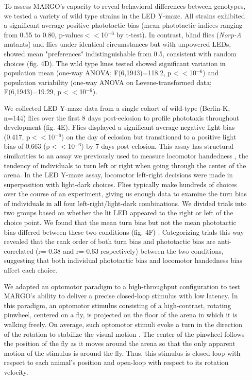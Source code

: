 \documentclass[10pt,letterpaper]{article}
\begin{document}
To assess MARGO's capacity to reveal behavioral differences between genotypes, we tested a variety of wild type strains in the LED Y-maze. All strains exhibited a significant average positive phototactic bias (mean phototactic indices ranging from 0.55 to 0.80, p-values$<<$10$^{-6}$ by t-test). In contrast, blind flies (\emph{Norp-A} mutants) and flies under identical circumstances but with unpowered LEDs, showed mean "preferences" indistinguishable from 0.5, consistent with random choices (fig. 4D). The wild type lines tested showed significant variation in population mean (one-way ANOVA; F(6,1943)=118.2, p$<<$10$^{-6}$) and population variability (one-way ANOVA on Levene-transformed data; F(6,1943)=19.29, p$<<$10$^{-6}$).

We collected LED Y-maze data from a single cohort of wild-type (Berlin-K, n=144) flies over the first 8 days post-eclosion to profile phototaxis throughout development (fig. 4E). Flies displayed a significant average negative light bias (0.417, p$<<$10$^{-6}$) on the day of eclosion but transitioned to a positive light bias of 0.663 (p$<<$10$^{-6}$) by 7 days post-eclosion. This assay has structural similarities to an assay we previously used to measure locomotor handedness \cite{Buchanan_Neuronal_2015}, the tendency of individuals to turn left or right when going through the center of the arena. In the LED Y-maze assay, locomotor left-right decisions were made in superposition with light-dark choices. Flies typically make hundreds of choices over the course of an experiment, giving us enough data to examine the turn bias of individuals in all four left-right/light-dark combinations. We divided trials into two groups based on whether the lit LED appeared to the right or left of the choice point. We found that the mean turn bias but not the mean phototactic bias differed between these two conditions (fig. 4F) \cite{Ayroles_Behavioral_2015}. Categorizing trials this way revealed that the rank order of both turn bias and phototactic bias are anti-correlated (r=-0.38 and r=-0.63 respectively) between the two conditions, suggesting that both individual phototactic bias and locomotor handedness bias affect each choice. 

We adapted an optomotor paradigm \cite{Cruz572792} to a high-throughput configuration to test MARGO's ability to deliver a precise closed-loop stimulus with low latency. In this paradigm, an optomotor stimulus consisting of a high-contrast, rotating pinwheel, centered on a fly, is projected on the floor of the arena in which it is walking freely. On average, such optomotor stimuli evoke a turn in the direction of the rotation to stabilize the visual motion \cite{Gtz_Visual_1973}. The center of the pinwheel follows the position of the fly as it moves around the arena so that the only apparent motion of the stimulus is around the fly. Thus, this stimulus is closed-loop with respect to each animal's position and open-loop with respect to its rotation velocity.
\end{document}
